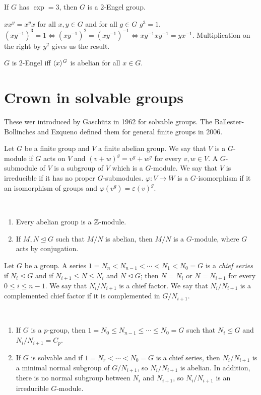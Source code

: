 \documentclass[twoside, 11pt]{article}
\begin{document}
\begin{prop}
If $G$ has $\exp=3$, then $G$ is a 2-Engel group.
\end{prop} 
\begin{dem}
$xx^y=x^yx$ for all $x,y\in G$ and for all $g\in G$ $g^3=1$. $(xy^{-1})^3=1\Leftrightarrow (xy^{-1})^2=(xy^{-1})^{-1}\Leftrightarrow xy^{-1}xy^{-1}=yx^{-1}$. Multiplication on the right by $y^2$ gives us the result. 
\end{dem}

$G$ is 2-Engel iff $\langle{x}\rangle^G$ is abelian for all $x\in G$.


\section{Crown in solvable groups}
These wer introduced by Gaschütz in 1962 for solvable groups. The Ballester-Bollinches and Ezqueno defined them for general finite groups in 2006. 

\begin{defi}
Let $G$ be a finite group and $V$ a finite abelian group. We say that $V$ is a $G$-module if $G$ acts on $V$ and $(v+w)^g=v^g+w^g$ for every $v,w\in V$. A $G$-submodule of $V$ is a subgroup of $V$ which is a $G$-module. We say that $V$ is irreducible if it has no proper $G$-submodules. $\varphi:V\to W$ is a $G$-isomorphism if it an isomorphism of groups and $\varphi(v^g)=\varepsilon(v)^g$.
\end{defi}

\begin{ej}\
\begin{enumerate}
\item Every abelian group is a $\mathbb{Z}$-module.
\item If $M,N\trianglelefteq G$ such that $M/N$ is abelian, then $M/N$ is a $G$-module, where $G$ acts by conjugation. 
\end{enumerate}
\end{ej}

\begin{defi}
Let $G$ be a group. A series $1=N_n<N_{n-1}<\cdots<N_1<N_0=G$ is a \emph{chief series} if $N_i\trianglelefteq G$ and if $N_{i+1}\leq N\leq N_i$ and $N\trianglelefteq G$; then $N=N_i$ or $N=N_{i+1}$ for every $0\leq i\leq n-1$. We say that $N_i/N_{i+1}$ is a chief factor. We say that $N_i/N_{i+1}$ is a complemented chief factor if it is complemented in $G/N_{i+1}$.
\end{defi}

\begin{ej}\
\begin{enumerate}
\item
 If $G$ is a $p$-group, then $1=N_0\leq N_{n-1}\leq\cdots\leq N_0=G$ such that $N_i\trianglelefteq G$ and $N_i/N_{i+1}=C_p$.
 
 \item If $G$ is solvable and if $1=N_r<\cdots <N_0=G$ is a chief series, then $N_i/N_{i+1}$ is a minimal normal subgroup of $G/N_{i+1}$, so $N_i/N_{i+1}$ is abelian. In addition, there is no normal subgroup between $N_i$ and $N_{i+1}$, so $N_i/N_{i+1}$ is an irreducible $G$-module. 
\end{enumerate}
\end{ej}
\end{document}
